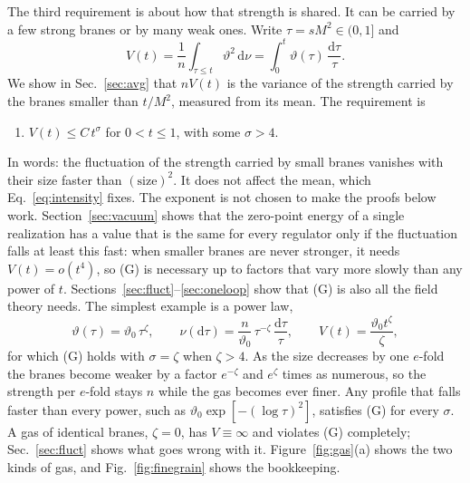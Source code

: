 \documentclass[aps,prd,10pt,twocolumn,superscriptaddress,nofootinbib,floatfix,longbibliography]{revtex4-2}
\newcommand{\dd}{\mathrm{d}}
\begin{document}
The third requirement is about how that strength is shared. It can be carried by a few strong branes or by many weak ones. Write $\tau=sM^2\in(0,1]$ and
\begin{equation}
\label{eq:V}
V(t)=\frac1n\int_{\tau\le t}\vartheta^2\,\dd\nu=\int_0^t\vartheta(\tau)\,\frac{\dd\tau}\tau .
\end{equation}
We show in Sec.~\ref{sec:avg} that $nV(t)$ is the variance of the strength carried by the branes smaller than $t/M^2$, measured from its mean. The requirement is
\begin{enumerate}[label=\textup{(G)},leftmargin=2.4em,itemsep=0.15em]
\item $V(t)\le C\,t^{\sigma}$ for $0<t\le1$, with some $\sigma>4$.
\end{enumerate}
In words: the fluctuation of the strength carried by small branes vanishes with their size faster than $(\text{size})^{2}$. It does not affect the mean, which Eq.~\eqref{eq:intensity} fixes. The exponent is not chosen to make the proofs below work. Section~\ref{sec:vacuum} shows that the zero-point energy of a single realization has a value that is the same for every regulator only if the fluctuation falls at least this fast: when smaller branes are never stronger, it needs $V(t)=o(t^4)$, so (G) is necessary up to factors that vary more slowly than any power of $t$. Sections~\ref{sec:fluct}--\ref{sec:oneloop} show that (G) is also all the field theory needs. The simplest example is a power law,
\begin{equation}
\label{eq:finegrain}
\vartheta(\tau)=\vartheta_0\,\tau^{\zeta},\qquad\nu(\dd\tau)=\frac n{\vartheta_0}\,\tau^{-\zeta}\,\frac{\dd\tau}\tau,\qquad V(t)=\frac{\vartheta_0t^{\zeta}}\zeta ,
\end{equation}
for which (G) holds with $\sigma=\zeta$ when $\zeta>4$. As the size decreases by one $e$-fold the branes become weaker by a factor $e^{-\zeta}$ and $e^{\zeta}$ times as numerous, so the strength per $e$-fold stays $n$ while the gas becomes ever finer. Any profile that falls faster than every power, such as $\vartheta_0\exp[-(\log\tau)^2]$, satisfies (G) for every $\sigma$. A gas of identical branes, $\zeta=0$, has $V\equiv\infty$ and violates (G) completely; Sec.~\ref{sec:fluct} shows what goes wrong with it. Figure~\ref{fig:gas}(a) shows the two kinds of gas, and Fig.~\ref{fig:finegrain} shows the bookkeeping.
\end{document}
